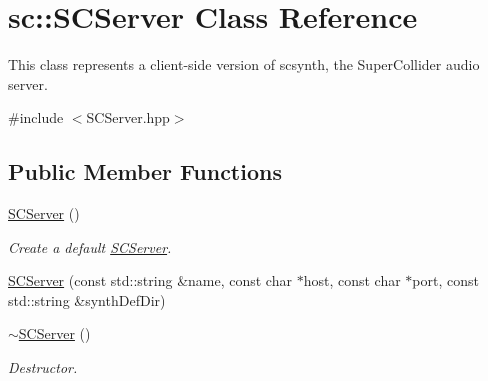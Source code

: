 \hypertarget{classsc_1_1SCServer}{\section{sc\-:\-:S\-C\-Server Class Reference}
\label{classsc_1_1SCServer}
}


This class represents a client-\/side version of scsynth, the Super\-Collider audio server.  




{\ttfamily \#include $<$S\-C\-Server.\-hpp$>$}

\subsection*{Public Member Functions}
\begin{DoxyCompactItemize}
\item 
\hypertarget{classsc_1_1SCServer_aaec728927e957f6190682760bb191661}{\hyperlink{classsc_1_1SCServer_aaec728927e957f6190682760bb191661}{S\-C\-Server} ()}\label{classsc_1_1SCServer_aaec728927e957f6190682760bb191661}

\begin{DoxyCompactList}\small\item\em Create a default \hyperlink{classsc_1_1SCServer}{S\-C\-Server}. \end{DoxyCompactList}\item 
\hyperlink{classsc_1_1SCServer_a5be05ff132abc5927e5ce3423978238d}{S\-C\-Server} (const std\-::string \&name, const char $\ast$host, const char $\ast$port, const std\-::string \&synth\-Def\-Dir)
\item 
\hypertarget{classsc_1_1SCServer_a673ad092d5d67da3be3aa04f2ac19ec6}{\hyperlink{classsc_1_1SCServer_a673ad092d5d67da3be3aa04f2ac19ec6}{$\sim$\-S\-C\-Server} ()}\label{classsc_1_1SCServer_a673ad092d5d67da3be3aa04f2ac19ec6}

\begin{DoxyCompactList}\small\item\em Destructor. \end{DoxyCompactList}\end{DoxyCompactItemize}
